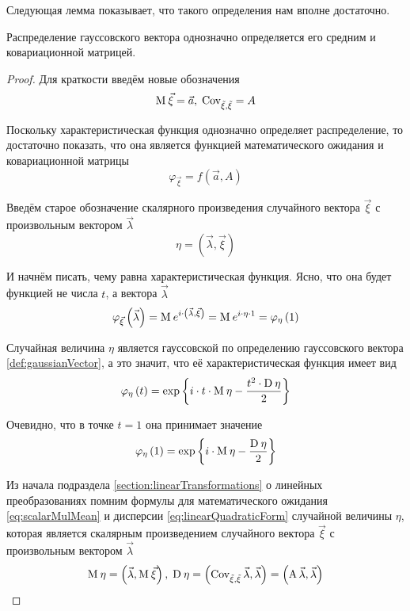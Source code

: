 Следующая лемма показывает, что такого определения нам вполне достаточно.

\begin{lemma}\label{lemma:gaussianVector:characteristicFunction}
    Распределение гауссовского вектора однозначно определяется его средним и
    ковариационной матрицей.
\end{lemma}
\begin{proof}
    Для краткости введём новые обозначения
    $$\operatorname{M}_{} \vec{\xi} = \vec{a},\; \operatorname{Cov^{}_{\vec{\xi}, \vec{\xi}}} = A$$

    Поскольку характеристическая функция однозначно определяет распределение,
    то достаточно показать, что она является функцией математического ожидания
    и ковариационной матрицы
    $$\varphi_{\vec{\xi}} = f\left( \vec{a}, A \right)$$

    Введём старое обозначение скалярного произведения случайного вектора
    $\vec{\xi}$ с произвольным вектором $\vec{\lambda}$
    $$\eta = \left( \vec{\lambda}, \vec{\xi} \right)$$

    И начнём писать, чему равна характеристическая функция. Ясно, что она будет
    функцией не числа $t$, а вектора $\vec{\lambda}$
    $$\varphi_{\vec{\xi}}\left( \vec{\lambda} \right)
        = \operatorname{M}_{} e^{i \cdot \left( \vec{\lambda}, \vec{\xi} \right)}
        = \operatorname{M}_{} e^{i \cdot \eta \cdot 1}
        = \varphi_{\eta}\left( 1 \right)$$

    Случайная величина $\eta$ является гауссовской по определению гауссовского
    вектора \ref{def:gaussianVector}, а это значит, что её характеристическая
    функция имеет вид
    $$\varphi_{\eta}\left( t \right)
        = \exp{\left\{ i \cdot t \cdot \operatorname{M}_{} \eta
            - \frac{t^2 \cdot \operatorname{D}_{} \eta}{2} \right\}}$$

    Очевидно, что в точке $t=1$ она принимает значение
    $$\varphi_{\eta}\left( 1 \right)
        = \exp{\left\{ i \cdot \operatorname{M}_{} \eta
            - \frac{\operatorname{D}_{} \eta}{2} \right\}}$$

    Из начала подраздела \ref{section:linearTransformations} о линейных
    преобразованиях помним формулы для математического ожидания
    \eqref{eq:scalarMulMean} и дисперсии \eqref{eq:linearQuadraticForm}
    случайной величины $\eta$, которая является скалярным произведением
    случайного вектора $\vec{\xi}$ с произвольным вектором $\vec{\lambda}$
    $$\operatorname{M}_{} \eta = \left( \vec{\lambda}, \operatorname{M}_{} \vec{\xi} \right),\;
        \operatorname{D}_{} \eta
            = \left( \operatorname{\operatorname{Cov^{}_{\vec{\xi}, \vec{\xi}}}} \vec{\lambda} ,
                \vec{\lambda} \right)
            = \left( \operatorname{A} \vec{\lambda} ,
                \vec{\lambda} \right)$$


\end{proof}

